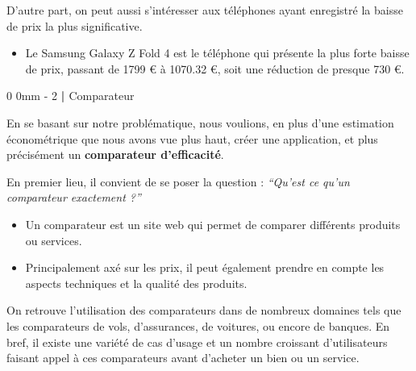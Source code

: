 \documentclass[
  12pt,
]{report}
\makeatletter
\providecommand{\tightlist}{%
  \setlength{\itemsep}{0pt}\setlength{\parskip}{0pt}}\usepackage{longtable,booktabs,array}
\renewcommand{\chapter}{%
    \clearpage %
    \@startsection{chapter}%
    {0} %
    {0mm} %
    {-\baselineskip} %
    {2\baselineskip} %
    {\normalfont\Huge\bfseries | \Huge\bfseries}%
}
\makeatother
\begin{document}
D'autre part, on peut aussi s'intéresser aux téléphones ayant enregistré
la baisse de prix la plus significative.

\begin{itemize}
\tightlist
\item
  Le Samsung Galaxy Z Fold 4 est le téléphone qui présente la plus forte
  baisse de prix, passant de 1799 € à 1070.32 €, soit une réduction de
  presque 730 €.
\end{itemize}

\chapter{Comparateur}\label{comparateur}

En se basant sur notre problématique, nous voulions, en plus d'une
estimation économétrique que nous avons vue plus haut, créer une
application, et plus précisément un \textbf{comparateur d'efficacité}.

En premier lieu, il convient de se poser la question : \emph{``Qu'est ce
qu'un comparateur exactement ?''}

\begin{tcolorbox}[enhanced jigsaw, leftrule=.75mm, opacityback=0, bottomtitle=1mm, title=\textcolor{quarto-callout-tip-color}{\faLightbulb}\hspace{0.5em}{Définition}, colbacktitle=quarto-callout-tip-color!10!white, opacitybacktitle=0.6, coltitle=black, colback=white, left=2mm, breakable, arc=.35mm, toptitle=1mm, titlerule=0mm, toprule=.15mm, rightrule=.15mm, colframe=quarto-callout-tip-color-frame, bottomrule=.15mm]

\begin{itemize}
\item
  Un comparateur est un site web qui permet de comparer différents
  produits ou services.
\item
  Principalement axé sur les prix, il peut également prendre en compte
  les aspects techniques et la qualité des produits.
\end{itemize}

\end{tcolorbox}

On retrouve l'utilisation des comparateurs dans de nombreux domaines
tels que les comparateurs de vols, d'assurances, de voitures, ou encore
de banques. En bref, il existe une variété de cas d'usage et un nombre
croissant d'utilisateurs faisant appel à ces comparateurs avant
d'acheter un bien ou un service.
\end{document}
